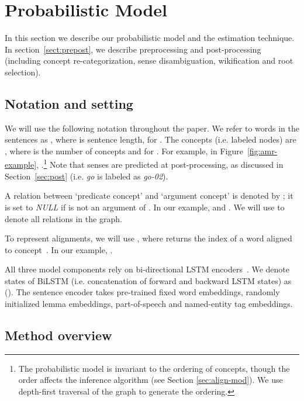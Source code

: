 \documentclass[11pt,a4paper]{article}
\begin{document}
\section{Probabilistic Model}

In this section we describe our probabilistic model and the estimation technique. 
In section~\ref{sect:prepost}, we describe preprocessing and post-processing (including concept re-categorization,  sense disambiguation, wikification  and root selection).



\subsection{Notation and setting}

We will use the following notation throughout the paper.
We refer to words in the sentences as , where  is sentence length,  for . The concepts (i.e. labeled nodes) are , where  is the number of concepts and  for . For example, in Figure~\ref{fig:amr-example}, .\footnote{The probabilistic model is invariant to the ordering of concepts, though the order affects the inference algorithm (see Section \ref{sec:align-mod}). We use depth-first traversal of the graph to generate the ordering.} Note that senses are predicted at post-processing, as discussed in Section~\ref{sec:post} (i.e. {\it go} is labeled as {\it go-02}).


A relation between `predicate concept' 
and `argument concept'  is denoted by ; it is set to \textit{NULL} if  is not an argument of .
In our example,  and . We will use  to denote all relations in the graph. 

To represent alignments, we will use
, where  returns the index of a word aligned to concept~. In our example, . 



All three model components rely on  bi-directional LSTM encoders~\cite{BiLSTM}. We denote states of BiLSTM (i.e. concatenation of forward and backward LSTM states) as  ().  The sentence encoder takes pre-trained fixed word embeddings, randomly initialized lemma embeddings, part-of-speech  and named-entity tag embeddings. 


\subsection{Method overview}
\label{sec:overview}
\end{document}
